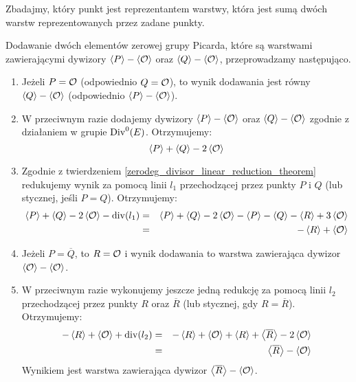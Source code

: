 \noindent
Zbadajmy, który punkt jest reprezentantem warstwy,
która jest sumą dwóch warstw reprezentowanych przez zadane punkty.

\begin{fact}\label{piczero_addition_fact}
Dodawanie dwóch elementów zerowej grupy Picarda,
które są warstwami zawierającymi dywizory
$\left\langle P\right\rangle - \left\langle\mathcal{O}\right\rangle$ oraz $\left\langle Q\right\rangle - \left\langle\mathcal{O}\right\rangle$,
przeprowadzamy następująco.
\begin{enumerate}
\item
Jeżeli $P = \mathcal{O}$ (odpowiednio $Q = \mathcal{O}$),
to wynik dodawania jest równy
$\left\langle Q\right\rangle - \left\langle\mathcal{O}\right\rangle$ (odpowiednio $\left\langle P\right\rangle - \left\langle\mathcal{O}\right\rangle$).
\item
W przeciwnym razie dodajemy dywizory
$\left\langle P\right\rangle - \left\langle\mathcal{O}\right\rangle$ oraz $\left\langle Q\right\rangle - \left\langle\mathcal{O}\right\rangle$
zgodnie z działaniem w grupie $\operatorname{Div}^0(E)$.
Otrzymujemy:
\begin{equation*}
\left\langle P\right\rangle + \left\langle Q\right\rangle - 2\left\langle\mathcal{O}\right\rangle
\end{equation*}
\item
Zgodnie z twierdzeniem \ref{zerodeg_divisor_linear_reduction_theorem}
redukujemy wynik za pomocą linii $l_1$ przechodzącej przez punkty $P$ i $Q$
(lub stycznej, jeśli $P = Q$).
Otrzymujemy:
\begin{eqnarray*}
\left\langle P\right\rangle + \left\langle Q\right\rangle - 2\left\langle\mathcal{O}\right\rangle - \operatorname{div}(l_1)
& = & \left\langle P\right\rangle + \left\langle Q\right\rangle - 2\left\langle\mathcal{O}\right\rangle
- \left\langle P\right\rangle - \left\langle Q\right\rangle - \left\langle R\right\rangle + 3\left\langle\mathcal{O}\right\rangle
\\ & = &
-\left\langle R\right\rangle + \left\langle\mathcal{O}\right\rangle
\end{eqnarray*}
\item
Jeżeli $P = \overline{Q}$,
to $R = \mathcal{O}$
i wynik dodawania to warstwa
zawierająca dywizor $\left\langle\mathcal{O}\right\rangle - \left\langle\mathcal{O}\right\rangle$.
\item
W przeciwnym razie wykonujemy jeszcze jedną redukcję za pomocą linii $l_2$
przechodzącej przez punkty $R$ oraz $\overline{R}$
(lub stycznej, gdy $R = \overline{R}$).
Otrzymujemy:
\begin{eqnarray*}
-\left\langle R\right\rangle + \left\langle\mathcal{O}\right\rangle + \operatorname{div}(l_2)
& = & -\left\langle R\right\rangle + \left\langle\mathcal{O}\right\rangle
+ \left\langle R\right\rangle + \left\langle\overline{R}\right\rangle - 2\left\langle\mathcal{O}\right\rangle
\\ & = &
\left\langle\overline{R}\right\rangle - \left\langle\mathcal{O}\right\rangle
\end{eqnarray*}
Wynikiem jest warstwa
zawierająca dywizor $\left\langle\overline{R}\right\rangle - \left\langle\mathcal{O}\right\rangle$.
\end{enumerate}
\end{fact}
